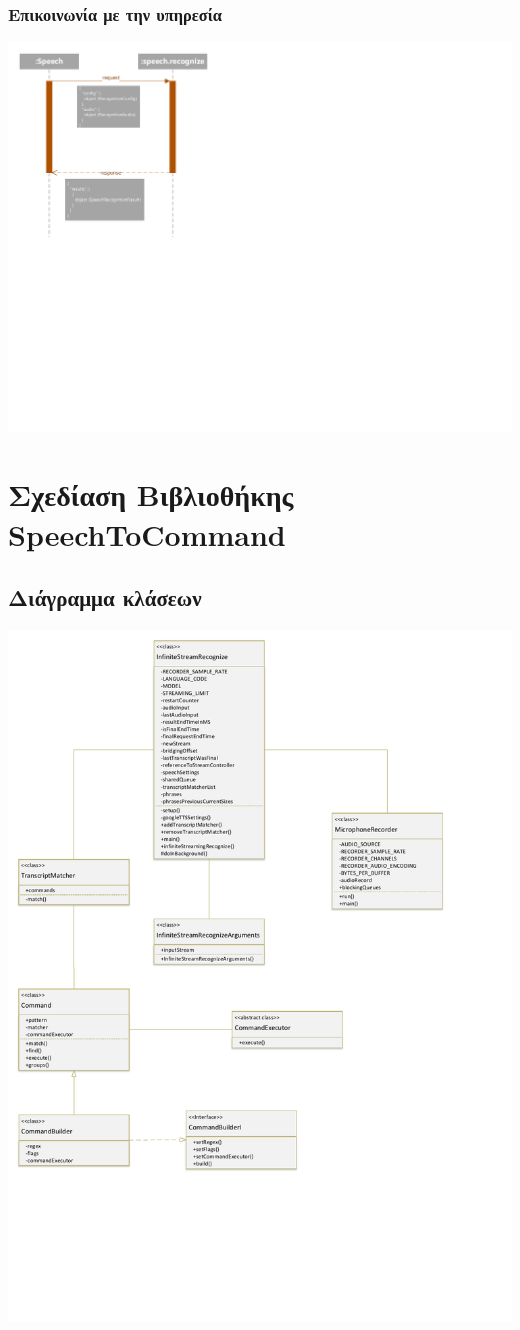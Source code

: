 \documentclass[oneside, 12pt]{book}
\begin{document}
\subsection{Επικοινωνία με την υπηρεσία}
\includegraphics{uml/library_service_sequence_diagram.pdf}
\chapter{Σχεδίαση Βιβλιοθήκης SpeechToCommand}
\label{ch:σχεδίαση-βιβλιοθήκης}
\newpage
\section{Διάγραμμα κλάσεων}\label{sec:διάγραμμα-κλάσεων}
\includegraphics[scale=0.5]{uml/library_uml_class_diagram.pdf}
\newpage
\end{document}
